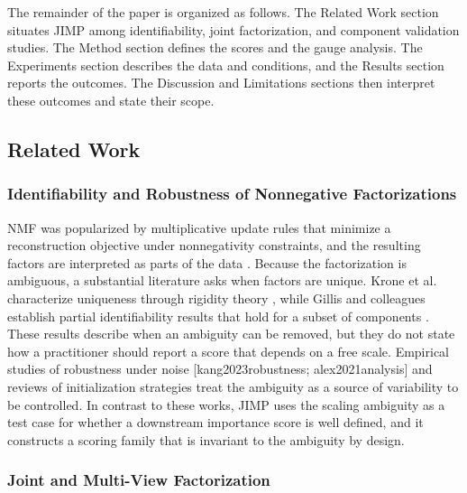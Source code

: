 \documentclass{article}
\begin{document}
The remainder of the paper is organized as follows. The Related Work section situates JIMP among identifiability, joint factorization, and component validation studies. The Method section defines the scores and the gauge analysis. The Experiments section describes the data and conditions, and the Results section reports the outcomes. The Discussion and Limitations sections then interpret these outcomes and state their scope.

\subsection{Related Work}

\label{sec:related_work}

\subsubsection{Identifiability and Robustness of Nonnegative Factorizations}

\label{sec:identifiability_and_robustness_of_nonneg}

NMF was popularized by multiplicative update rules that minimize a reconstruction objective under nonnegativity constraints, and the resulting factors are interpreted as parts of the data \cite{gillis2020nonnegative}. Because the factorization is ambiguous, a substantial literature asks when factors are unique. Krone et al. characterize uniqueness through rigidity theory \cite{krone2021uniqueness}, while Gillis and colleagues establish partial identifiability results that hold for a subset of components \cite{gillis2023partial}. These results describe when an ambiguity can be removed, but they do not state how a practitioner should report a score that depends on a free scale. Empirical studies of robustness under noise [kang2023robustness; alex2021analysis] and reviews of initialization strategies treat the ambiguity as a source of variability to be controlled. In contrast to these works, JIMP uses the scaling ambiguity as a test case for whether a downstream importance score is well defined, and it constructs a scoring family that is invariant to the ambiguity by design.

\subsubsection{Joint and Multi-View Factorization}

\label{sec:joint_and_multi_view_factorization}
\end{document}
